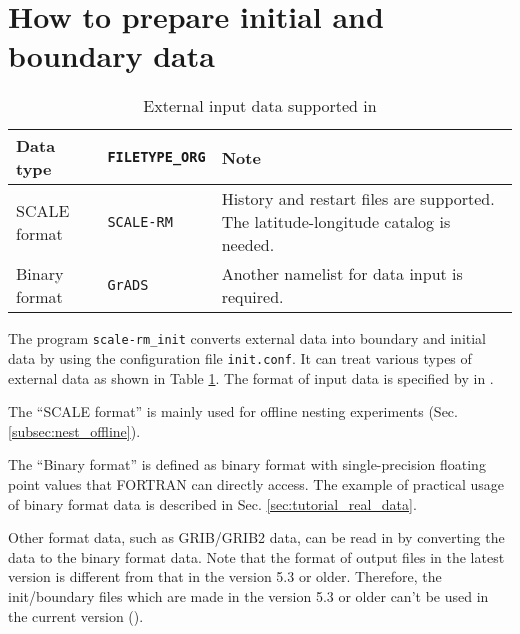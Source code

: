 \section{How to prepare initial and boundary data} \label{sec:adv_datainput}

\begin{table}[tbh]
\begin{center}
\caption{External input data supported in \scalelib}
\begin{tabularx}{150mm}{l|l|X} \hline
 \rowcolor[gray]{0.9} Data type   & \verb|FILETYPE_ORG|  & Note \\ \hline
 SCALE format   & \verb|SCALE-RM|     & History and restart files are supported. The latitude-longitude catalog is needed. \\ \hline
 Binary format  & \verb|GrADS|        & Another namelist for data input is required.    \\ \hline
\end{tabularx}
\label{tab:inputdata_format}
\end{center}
\end{table}

The program \verb|scale-rm_init| converts external data into boundary and initial data by using the configuration file \verb|init.conf|.
It can treat various types of external data as shown in Table \ref{tab:inputdata_format}.
The format of input data is specified by  in .

The ``SCALE format'' is mainly used for offline nesting experiments (Sec. \ref{subsec:nest_offline}).

The ``Binary format'' is defined as binary format with single-precision floating point values that FORTRAN can directly access.
The example of practical usage of binary format data is described in Sec. \ref{sec:tutorial_real_data}.


Other format data, such as GRIB/GRIB2 data, can be read in \scale by converting the data to the binary format data.
Note that the format of output files in the latest version is different from that in the version 5.3 or older.
Therefore, the init/boundary files which are made in the version 5.3 or older can't be used in the current version (\scalelib \version).

